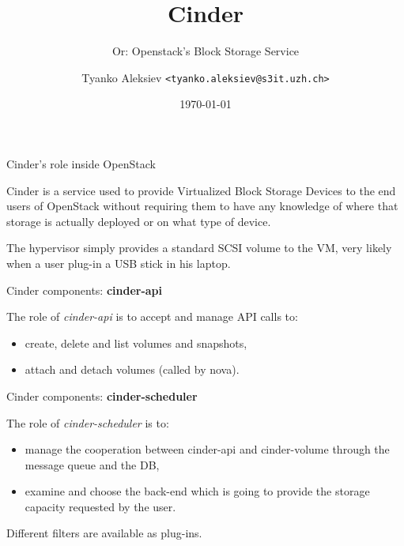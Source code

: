 \documentclass[english,serif,mathserif]{beamer}
\begin{document}
\title[Short Title]{Cinder}
\subtitle{Or: Openstack's Block Storage Service}

\author{Tyanko Aleksiev \texttt{<tyanko.aleksiev@s3it.uzh.ch>}}

\date{\today}

\maketitle

\begin{frame}{Cinder's role inside OpenStack}

Cinder is a service used to provide Virtualized Block Storage Devices to the 
end users of OpenStack without requiring them to have any knowledge of where 
that storage is actually deployed or on what type of device.

\vspace{5mm}

The hypervisor simply provides a standard SCSI volume to the VM, very likely
when a user plug-in a USB stick in his laptop.

\end{frame}

\begin{frame}{Cinder components: \textbf{cinder-api}}

The role of \textit{cinder-api} is to accept and manage API calls to:

\begin{itemize}
\item create, delete and list volumes and snapshots,
\item attach and detach volumes (called by nova).
\end{itemize}

\end{frame}


\begin{frame}{Cinder components: \textbf{cinder-scheduler}}

The role of \textit{cinder-scheduler} is to:
\begin{itemize}
\item manage the cooperation between cinder-api and cinder-volume through the message queue and the DB,
\item examine and choose the back-end which is going to provide the storage capacity requested by the user.
\end{itemize}
Different filters are available as plug-ins.

\end{frame}
\end{document}
